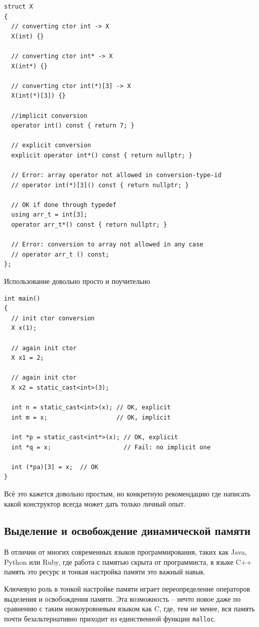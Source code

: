 \documentclass[a4paper,12pt,oneside]{article}
\begin{document}
\begin{lstlisting}
struct X 
{
  // converting ctor int -> X
  X(int) {}

  // converting ctor int* -> X
  X(int*) {}

  // converting ctor int(*)[3] -> X
  X(int(*)[3]) {}

  //implicit conversion
  operator int() const { return 7; }
 
  // explicit conversion
  explicit operator int*() const { return nullptr; }
 
  // Error: array operator not allowed in conversion-type-id
  // operator int(*)[3]() const { return nullptr; }

  // OK if done through typedef
  using arr_t = int[3];
  operator arr_t*() const { return nullptr; } 

  // Error: conversion to array not allowed in any case
  // operator arr_t () const; 
};
\end{lstlisting}
 
Использование довольно просто и поучительно

\begin{lstlisting}
int main()
{
  // init ctor conversion
  X x(1);

  // again init ctor
  X x1 = 2;

  // again init ctor
  X x2 = static_cast<int>(3);
 
  int n = static_cast<int>(x); // OK, explicit
  int m = x;                   // OK, implicit
 
  int *p = static_cast<int*>(x); // OK, explicit
  int *q = x;                    // Fail: no implicit one
 
  int (*pa)[3] = x;  // OK
}
\end{lstlisting}

Всё это кажется довольно простым, но конкретную рекомендацию где написать какой конструктор всегда может дать только личный опыт.

\pagebreak
\subsection{Выделение и освобождение динамической памяти}\label{subsec:newdeleteredef}

В отличии от многих современных языков программирования, таких как Java, Python или Ruby, где работа с памятью скрыта от программиста, в языке C++ память это ресурс и тонкая настройка памяти это важный навык.

Ключевую роль в тонкой настройке памяти играет переопределение операторов выделения и освобождения памяти. Эта возможность -- нечто новое даже по сравнению с таким низкоуровневым языком как C, где, тем не менее, вся память почти безальтернативно приходит из единственной функции \lstinline!malloc!.
\end{document}
